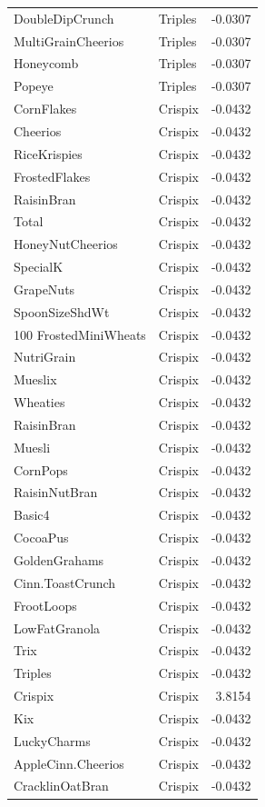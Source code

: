 \begin{longtable}{llr}
DoubleDipCrunch & Triples & -0.0307 \\
MultiGrainCheerios & Triples & -0.0307 \\
Honeycomb & Triples & -0.0307 \\
Popeye & Triples & -0.0307 \\
CornFlakes & Crispix & -0.0432 \\
Cheerios & Crispix & -0.0432 \\
RiceKrispies & Crispix & -0.0432 \\
FrostedFlakes & Crispix & -0.0432 \\
RaisinBran & Crispix & -0.0432 \\
Total & Crispix & -0.0432 \\
HoneyNutCheerios & Crispix & -0.0432 \\
SpecialK & Crispix & -0.0432 \\
GrapeNuts & Crispix & -0.0432 \\
SpoonSizeShdWt & Crispix & -0.0432 \\
100%
FrostedMiniWheats & Crispix & -0.0432 \\
NutriGrain & Crispix & -0.0432 \\
Mueslix & Crispix & -0.0432 \\
Wheaties & Crispix & -0.0432 \\
RaisinBran & Crispix & -0.0432 \\
Muesli & Crispix & -0.0432 \\
CornPops & Crispix & -0.0432 \\
RaisinNutBran & Crispix & -0.0432 \\
Basic4 & Crispix & -0.0432 \\
CocoaPus & Crispix & -0.0432 \\
GoldenGrahams & Crispix & -0.0432 \\
Cinn.ToastCrunch & Crispix & -0.0432 \\
FrootLoops & Crispix & -0.0432 \\
LowFatGranola & Crispix & -0.0432 \\
Trix & Crispix & -0.0432 \\
Triples & Crispix & -0.0432 \\
Crispix & Crispix & 3.8154 \\
Kix & Crispix & -0.0432 \\
LuckyCharms & Crispix & -0.0432 \\
AppleCinn.Cheerios & Crispix & -0.0432 \\
CracklinOatBran & Crispix & -0.0432 \\

\end{longtable}
